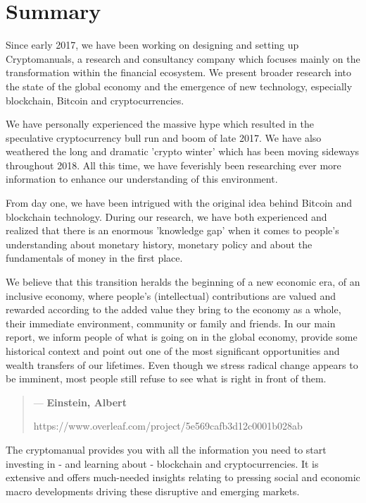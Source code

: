\chapter{Summary}
Since early 2017, we have been working on designing and setting up Cryptomanuals, a research and consultancy company which focuses mainly on the transformation within the financial ecosystem.  We present broader research into the state of the global economy and the emergence of new technology, especially blockchain, Bitcoin and cryptocurrencies.\medskip

We have personally experienced the massive hype which resulted in the speculative cryptocurrency bull run and boom of late 2017. We have also weathered the long and dramatic 'crypto winter' which has been moving sideways throughout 2018. All this time, we have feverishly been researching ever more information to enhance our understanding of this environment.\medskip 

From day one, we have been intrigued with the original idea behind Bitcoin and blockchain technology. During our research, we have both experienced and realized that there is an enormous 'knowledge gap' when it comes to people's understanding about monetary history, monetary policy and about the fundamentals of money in the first place.\medskip

We believe that this transition heralds the beginning of a new economic era, of an inclusive economy, where people's (intellectual) contributions are valued and rewarded according to the added value they bring to the economy as a whole, their immediate environment, community or family and friends. In our main report, we inform people of what is going on in the global economy, provide some historical context and point out one of the most significant opportunities and wealth transfers of our lifetimes. Even though we stress radical change appears to be imminent, most people still refuse to see what is right in front of them. 

\begin{quotation}

  \textit{}
  \begin{flushright}
    \small{--- \textbf{Einstein, Albert}}
  \end{flushright}
https://www.overleaf.com/project/5e569cafb3d12c0001b028ab
\end{quotation}

The cryptomanual provides you with all the information you need to start investing in - and learning about - blockchain and cryptocurrencies. It is extensive and offers much-needed insights relating to pressing social and economic macro developments driving these disruptive and emerging markets.\medskip 

